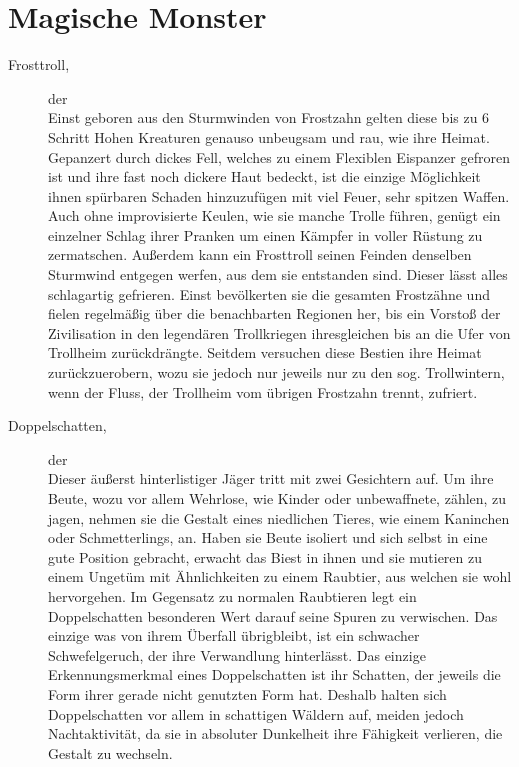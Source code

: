\documentclass[a4paper,12pt,oneside]{book}
\begin{document}
\chapter{Magische Monster}

\begin{description}

\item[Frosttroll,]der
\\Einst geboren aus den Sturmwinden von Frostzahn gelten diese bis zu 6 Schritt Hohen Kreaturen genauso unbeugsam und rau, wie ihre Heimat. Gepanzert durch dickes Fell, welches zu einem Flexiblen Eispanzer gefroren ist und ihre fast noch dickere Haut bedeckt, ist die einzige Möglichkeit ihnen spürbaren Schaden hinzuzufügen mit viel Feuer, sehr spitzen Waffen. Auch ohne improvisierte Keulen, wie sie manche Trolle führen, genügt ein einzelner Schlag ihrer Pranken um einen Kämpfer in voller Rüstung zu zermatschen. Außerdem kann ein Frosttroll seinen Feinden denselben Sturmwind entgegen werfen, aus dem sie entstanden sind. Dieser lässt alles schlagartig gefrieren. Einst bevölkerten sie die gesamten Frostzähne und fielen regelmäßig über die benachbarten Regionen her, bis ein Vorstoß der Zivilisation in den legendären Trollkriegen ihresgleichen bis an die Ufer von Trollheim zurückdrängte. Seitdem versuchen diese Bestien ihre Heimat zurückzuerobern, wozu sie jedoch nur jeweils nur zu den sog. Trollwintern, wenn der Fluss, der Trollheim vom übrigen Frostzahn trennt, zufriert.

\item[Doppelschatten,] der
\\Dieser äußerst hinterlistiger Jäger tritt mit zwei Gesichtern auf. Um ihre Beute, wozu vor allem Wehrlose, wie Kinder oder unbewaffnete, zählen, zu jagen, nehmen sie die Gestalt eines niedlichen Tieres, wie einem Kaninchen oder Schmetterlings, an. Haben sie Beute isoliert und sich selbst in eine gute Position gebracht, erwacht das Biest in ihnen und sie mutieren zu einem Ungetüm mit Ähnlichkeiten zu einem Raubtier, aus welchen sie wohl hervorgehen. Im Gegensatz zu normalen Raubtieren legt ein Doppelschatten besonderen Wert darauf seine Spuren zu verwischen. Das einzige was von ihrem Überfall übrigbleibt, ist ein schwacher Schwefelgeruch, der ihre Verwandlung hinterlässt. Das einzige Erkennungsmerkmal eines Doppelschatten ist ihr Schatten, der jeweils die Form ihrer gerade nicht genutzten Form hat. Deshalb halten sich Doppelschatten vor allem in schattigen Wäldern auf, meiden jedoch Nachtaktivität, da sie in absoluter Dunkelheit ihre Fähigkeit verlieren, die Gestalt zu wechseln.


\end{description}
\end{document}
